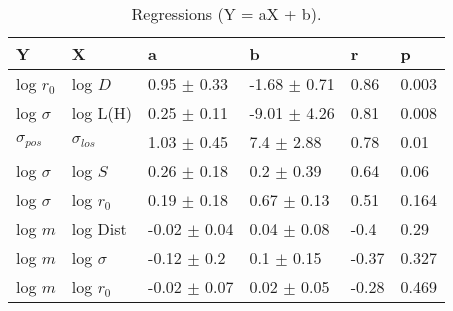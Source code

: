 \begin{table}
\centering
\caption{Regressions (Y = aX + b).}
\begin{tabular}{llllll}
\toprule
              Y &               X &                 a &                 b &      r &      p \\
\midrule
      log $r_0$ &         log $D$ &   0.95 $\pm$ 0.33 &  -1.68 $\pm$ 0.71 &   0.86 &  0.003 \\
   log $\sigma$ &        log L(H) &   0.25 $\pm$ 0.11 &  -9.01 $\pm$ 4.26 &   0.81 &  0.008 \\
 $\sigma_{pos}$ &  $\sigma_{los}$ &   1.03 $\pm$ 0.45 &    7.4 $\pm$ 2.88 &   0.78 &   0.01 \\
   log $\sigma$ &         log $S$ &   0.26 $\pm$ 0.18 &    0.2 $\pm$ 0.39 &   0.64 &   0.06 \\
   log $\sigma$ &     log $r_{0}$ &   0.19 $\pm$ 0.18 &   0.67 $\pm$ 0.13 &   0.51 &  0.164 \\
        log $m$ &        log Dist &  -0.02 $\pm$ 0.04 &   0.04 $\pm$ 0.08 &   -0.4 &   0.29 \\
        log $m$ &    log $\sigma$ &   -0.12 $\pm$ 0.2 &    0.1 $\pm$ 0.15 &  -0.37 &  0.327 \\
        log $m$ &     log $r_{0}$ &  -0.02 $\pm$ 0.07 &   0.02 $\pm$ 0.05 &  -0.28 &  0.469 \\
\bottomrule
\end{tabular}
\end{table}
